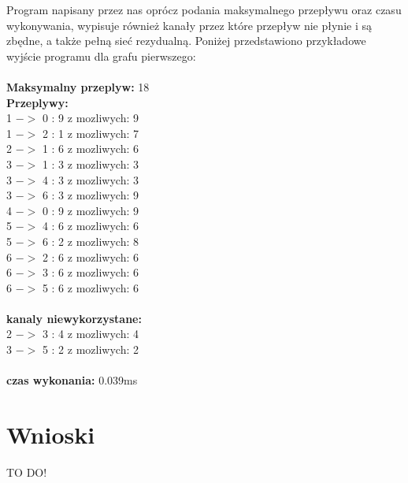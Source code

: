 \documentclass[a4paper,11pt]{article}
\begin{document}
    \vspace{0.3cm}
    Program napisany przez nas oprócz podania maksymalnego przepływu oraz czasu wykonywania, wypisuje również kanały przez które przepływ nie płynie i są zbędne, a także pełną sieć rezydualną. Poniżej przedstawiono przykładowe wyjście programu dla grafu pierwszego: \\ \\
    \textbf{Maksymalny przeplyw:} 18 \\
    \textbf{Przeplywy:} \\
    1 $->$ 0 : 9 z mozliwych: 9 \\
    1 $->$ 2 : 1 z mozliwych: 7 \\
    2 $->$ 1 : 6 z mozliwych: 6 \\
    3 $->$ 1 : 3 z mozliwych: 3 \\
    3 $->$ 4 : 3 z mozliwych: 3 \\
    3 $->$ 6 : 3 z mozliwych: 9 \\ 
    4 $->$ 0 : 9 z mozliwych: 9 \\
    5 $->$ 4 : 6 z mozliwych: 6 \\
    5 $->$ 6 : 2 z mozliwych: 8 \\
    6 $->$ 2 : 6 z mozliwych: 6 \\
    6 $->$ 3 : 6 z mozliwych: 6 \\
    6 $->$ 5 : 6 z mozliwych: 6 \\ \\
    
    \textbf{kanaly niewykorzystane:} \\
    2 $->$ 3 : 4 z mozliwych: 4 \\
    3 $->$ 5 : 2 z mozliwych: 2 \\ \\
    
    \textbf{czas wykonania:} 0.039ms
\section{Wnioski}
TO DO!
\end{document}
